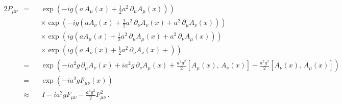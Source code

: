 \begin{alignat*}{2}
P_{\mu\nu} &= &&\exp\left(-ig\left(a\,A_\mu(x)+\frac{1}{2}a^2\,\partial_\mu A_\mu(x) \right)\right)\\
& &&\times\exp\left(-ig\left(aA_\nu(x) + \frac{1}{2}a^2\,\partial_\nu A_\nu(x) + a^2\,\partial_\mu A_\nu(x)\right)\right)\\
& &&\times\exp\left(ig\left(aA_\mu(x) + \frac{1}{2}a^2\,\partial_\mu A_\mu(x) + a^2\,\partial_\nu A_\mu(x)\right)\right)\\
& &&\times\exp\left(ig\left(a\,A_\nu(x)+\frac{1}{2}a^2\,\partial_\nu A_\nu(x) + \right)\right)\\
&= &&\exp\left(-ia^2g\,\partial_\mu A_\nu(x) + ia^2g\,\partial_\nu A_\mu(x) +\frac{a^2g^2}{2}[A_\mu(x),\,A_\nu(x)] - \frac{a^2g^2}{2}[A_\nu(x),\,A_\mu(x)]\right)\\
&= &&\exp\left(-ia^2g F_{\mu\nu}(x)\right)\\
&\approx &&\, I - ia^2 g F_{\mu\nu} -\frac{a^4 g^2}{2} F_{\mu\nu}^2\, .
\end{alignat*}

